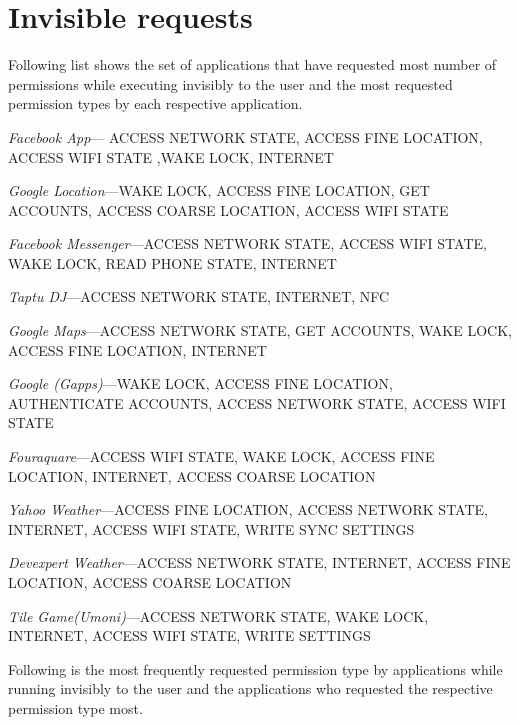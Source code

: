\documentclass[letterpaper,twocolumn,10pt]{article}
\newenvironment{packed_item}{
\begin{itemize}
  \setlength{\itemsep}{1pt}
  \setlength{\parskip}{0pt}
  \setlength{\parsep}{0pt}
}{\end{itemize}}
\begin{document}
{\footnotesize 


\appendix

\section{Invisible requests}
\label{app:invisible}

Following list shows the set of applications that have requested most number of permissions while executing invisibly to the user and the most requested permission types by each respective application.

\begin{packed_item}
\item {\it Facebook App}--- ACCESS NETWORK STATE, ACCESS FINE LOCATION, ACCESS WIFI STATE ,WAKE LOCK, INTERNET
\item {\it Google Location}---WAKE LOCK, ACCESS FINE LOCATION, GET ACCOUNTS, ACCESS COARSE LOCATION, ACCESS WIFI STATE
\item {\it Facebook Messenger}---ACCESS NETWORK STATE, ACCESS WIFI STATE, WAKE LOCK, READ PHONE STATE, INTERNET
\item {\it Taptu DJ}---ACCESS NETWORK STATE, INTERNET, NFC
\item {\it Google Maps}---ACCESS NETWORK STATE, GET ACCOUNTS, WAKE LOCK, ACCESS FINE LOCATION, INTERNET
\item {\it Google (Gapps)}---WAKE LOCK, ACCESS FINE LOCATION, AUTHENTICATE ACCOUNTS, ACCESS NETWORK STATE, ACCESS WIFI STATE
\item {\it Fouraquare}---ACCESS WIFI STATE, WAKE LOCK, ACCESS FINE LOCATION, INTERNET, ACCESS COARSE LOCATION
\item {\it Yahoo Weather}---ACCESS FINE LOCATION, ACCESS NETWORK STATE, INTERNET, ACCESS WIFI STATE, WRITE SYNC SETTINGS
\item {\it Devexpert Weather}---ACCESS NETWORK STATE, INTERNET, ACCESS FINE LOCATION, ACCESS COARSE LOCATION
\item {\it Tile Game(Umoni)}---ACCESS NETWORK STATE, WAKE LOCK, INTERNET, ACCESS WIFI STATE, WRITE SETTINGS
\end{packed_item}

Following is the most frequently requested permission type by applications while running invisibly to the user and the applications who requested the respective permission type most.

}
\end{document}
